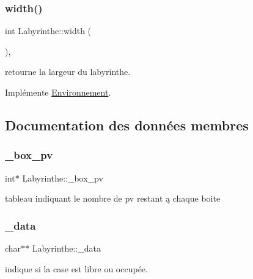 \subsubsection{\texorpdfstring{width()}{width()}}
{\footnotesize\ttfamily int Labyrinthe\+::width (\begin{DoxyParamCaption}{ }\end{DoxyParamCaption})\hspace{0.3cm}{\ttfamily [inline]}, {\ttfamily [virtual]}}



retourne la largeur du labyrinthe. 



Implémente \hyperlink{classEnvironnement_a9f5945b3cde5bd2b0d46250446989081}{Environnement}.



\subsection{Documentation des données membres}
\mbox{\label{classLabyrinthe_abadb9e695ee1bdcf1467611f62ff374e}} 
\subsubsection{\texorpdfstring{\+\_\+box\+\_\+pv}{\_box\_pv}}
{\footnotesize\ttfamily int$\ast$ Labyrinthe\+::\+\_\+box\+\_\+pv\hspace{0.3cm}{\ttfamily [private]}}



tableau indiquant le nombre de pv restant ą chaque boite 

\mbox{\label{classLabyrinthe_a93ccbd26c14359bec6a9898575f69237}} 
\subsubsection{\texorpdfstring{\+\_\+data}{\_data}}
{\footnotesize\ttfamily char$\ast$$\ast$ Labyrinthe\+::\+\_\+data\hspace{0.3cm}{\ttfamily [private]}}



indique si la case est libre ou occupée. 

